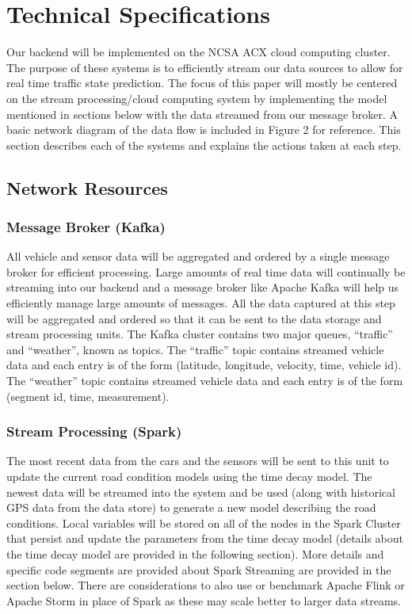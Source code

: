 \documentclass{vldb}
\begin{document}
\section{Technical Specifications}
Our backend will be implemented on the NCSA ACX cloud computing cluster. The purpose of these systems is to efficiently stream our data sources to allow for real time traffic state prediction. The focus of this paper will mostly be centered on the stream processing/cloud computing system by implementing the model mentioned in sections below with the data streamed from our message broker. A basic network diagram of the data flow is included in Figure 2 for reference. This section describes each of the systems and explains the actions taken at each step.

\subsection{Network Resources}

\subsubsection{Message Broker (Kafka)}
All vehicle and sensor data will be aggregated and ordered by a single message broker for efficient processing. Large amounts of real time data will continually be streaming into our backend and a message broker like Apache Kafka will help us efficiently manage large amounts of messages. All the data captured at this step will be aggregated and ordered so that it can be sent to the data storage and stream processing units. The Kafka cluster contains two major queues, “traffic” and “weather”, known as topics. The “traffic” topic contains streamed vehicle data and each entry is of the form (latitude, longitude, velocity, time, vehicle id). The “weather” topic contains streamed vehicle data and each entry is of the form (segment id, time, measurement).

\subsubsection{Stream Processing (Spark)}
The most recent data from the cars and the sensors will be sent to this unit to update the current road condition models using the time decay model. The newest data will be streamed into the system and be used (along with historical GPS data from the data store) to generate a new model describing the road conditions. Local variables will be stored on all of the nodes in the Spark Cluster that persist and update the parameters from the time decay model (details about the time decay model are provided in the following section). More details and specific code segments are provided about Spark Streaming are provided in the section below. There are considerations to also use or benchmark Apache Flink or Apache Storm in place of Spark as these may scale better to larger data streams. 
\end{document}
